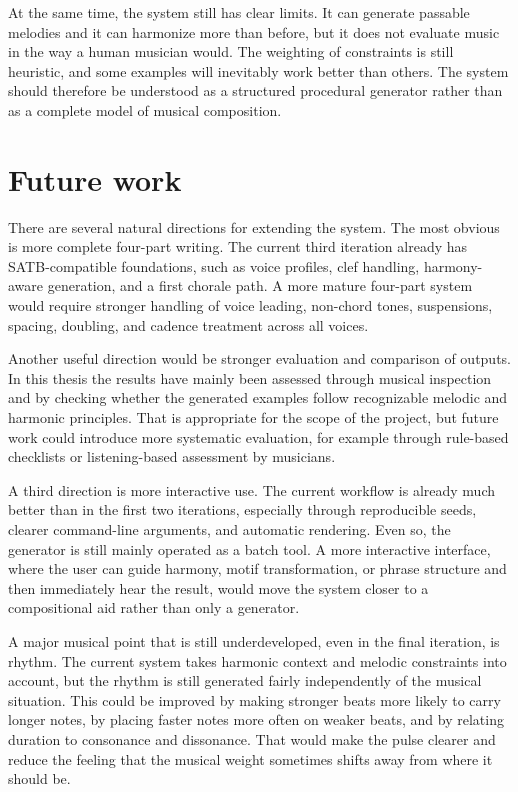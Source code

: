   At the same time, the system still has clear limits. It can generate passable melodies and it can harmonize more than before, but it does not evaluate music in the way a human musician would. The weighting of constraints is still heuristic, and some examples will inevitably work better than others. The system should therefore be understood as a structured procedural generator rather than as a complete model of musical composition.

\section{Future work}
  There are several natural directions for extending the system. The most obvious is more complete four-part writing. The current third iteration already has SATB-compatible foundations, such as voice profiles, clef handling, harmony-aware generation, and a first chorale path. A more mature four-part system would require stronger handling of voice leading, non-chord tones, suspensions, spacing, doubling, and cadence treatment across all voices.

  Another useful direction would be stronger evaluation and comparison of outputs. In this thesis the results have mainly been assessed through musical inspection and by checking whether the generated examples follow recognizable melodic and harmonic principles. That is appropriate for the scope of the project, but future work could introduce more systematic evaluation, for example through rule-based checklists or listening-based assessment by musicians.

  A third direction is more interactive use. The current workflow is already much better than in the first two iterations, especially through reproducible seeds, clearer command-line arguments, and automatic rendering. Even so, the generator is still mainly operated as a batch tool. A more interactive interface, where the user can guide harmony, motif transformation, or phrase structure and then immediately hear the result, would move the system closer to a compositional aid rather than only a generator.

  A major musical point that is still underdeveloped, even in the final iteration, is rhythm. The current system takes harmonic context and melodic constraints into account, but the rhythm is still generated fairly independently of the musical situation. This could be improved by making stronger beats more likely to carry longer notes, by placing faster notes more often on weaker beats, and by relating duration to consonance and dissonance. That would make the pulse clearer and reduce the feeling that the musical weight sometimes shifts away from where it should be.

